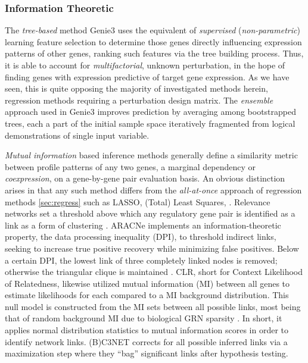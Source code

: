 \subsubsection{Information Theoretic}
\label{sec:info}
The \emph{tree-based} method Genie3 \citep{irrthum2010inferring} uses the equivalent of \emph{supervised} (\emph{non-parametric}) learning feature selection to determine those genes directly influencing expression patterns of other genes, ranking such features via the tree building process. Thus, it is able to account for \emph{multifactorial}, \ie unknown perturbation, in the hope of finding genes with expression predictive of target gene expression. As we have seen, this is quite opposing the majority of investigated methods herein, regression methods requiring a perturbation design matrix. The \emph{ensemble} approach used in Genie3 improves prediction by averaging among bootstrapped trees, each a part of the initial sample space iteratively fragmented from logical demonstrations of single input variable.

\emph{Mutual information} based inference methods generally define a similarity metric between profile patterns of any two genes, a marginal dependency or \emph{coexpression}, on a gene-by-gene pair evaluation basis. An obvious distinction arises in that any such method differs from the {\it all-at-once} approach of regression methods \cref{sec:regress} such as LASSO, (Total) Least Squares, \etc. Relevance networks set a threshold above which any regulatory gene pair is identified as a link as a form of clustering \citep{faith2007large}. ARACNe implements an information-theoretic property, the data processing inequality (DPI), to threshold indirect links, seeking to increase true positive recovery while minimizing false positives. Below a certain DPI, the lowest link of three completely linked nodes is removed; otherwise the triangular clique is maintained \citep{montes2014aracne}. CLR, short for Context Likelihood of Relatedness, likewise utilized mutual information (MI) between all genes to estimate likelihoods for each compared to a MI background distribution. This null model is constructed from the MI sets between all possible links, most being that of random background MI due to biological GRN sparsity \citep{faith2007large}. In short, it applies normal distribution statistics to mutual information scores in order to identify network links. (B)C3NET \citep{altay2010inferring,de2012bagging} corrects for all possible inferred links via a maximization step where they ``bag'' significant links after hypothesis testing.

